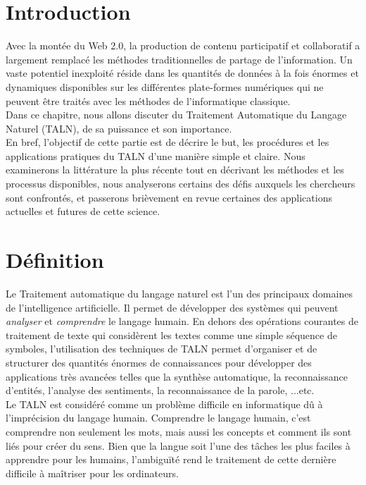 
\newpage
{}
\section{Introduction}
Avec la montée du Web 2.0, la production de contenu participatif et collaboratif a largement remplacé les méthodes traditionnelles de partage de l'information. Un vaste potentiel inexploité réside dans les quantités de données à la fois énormes et dynamiques disponibles sur les différentes plate-formes numériques qui ne peuvent être traités avec les méthodes de l'informatique classique.\\
Dans ce chapitre, nous allons discuter du Traitement Automatique du Langage Naturel (TALN), de sa puissance et son importance.\\ 

En bref, l'objectif de cette partie est de décrire le but, les procédures et les applications pratiques du TALN d'une manière simple et claire. Nous examinerons la littérature la plus récente tout en décrivant les méthodes et les processus disponibles, nous analyserons certains des défis auxquels les chercheurs sont confrontés, et passerons brièvement en revue certaines des applications actuelles et futures de cette science.

\section{Définition}
Le Traitement automatique du langage naturel est l'un des principaux domaines de l'intelligence artificielle. Il permet de développer des systèmes qui peuvent \emph{analyser} et \emph{comprendre} le langage humain. En dehors des opérations courantes de traitement de texte qui considèrent les textes comme une simple séquence de symboles, l'utilisation des techniques de TALN permet d'organiser et de structurer des quantités énormes de connaissances pour développer des applications très avancées telles que la synthèse automatique, la reconnaissance d'entités, l'analyse des sentiments, la reconnaissance de la parole, ...etc.\\

Le TALN est considéré comme un problème difficile en informatique dû à l'imprécision du langage humain. Comprendre le langage humain, c'est comprendre non seulement les mots, mais aussi les concepts et comment ils sont liés pour créer du sens. Bien que la langue soit l'une des tâches les plus faciles à apprendre pour les humains, l'ambiguïté rend le traitement de cette dernière difficile à maîtriser pour les ordinateurs.


